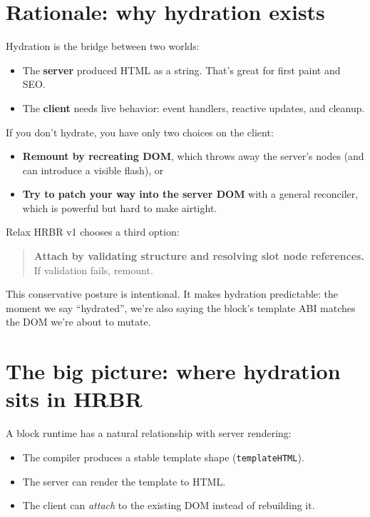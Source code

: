 \section{Rationale: why hydration exists}

Hydration is the bridge between two worlds:

\begin{itemize}
  \item The \textbf{server} produced HTML as a string. That’s great for first paint and SEO.
  \item The \textbf{client} needs live behavior: event handlers, reactive updates, and cleanup.
\end{itemize}

If you don’t hydrate, you have only two choices on the client:

\begin{itemize}
  \item \textbf{Remount by recreating DOM}, which throws away the server’s nodes (and can introduce a visible flash), or
  \item \textbf{Try to patch your way into the server DOM} with a general reconciler, which is powerful but hard to make airtight.
\end{itemize}

Relax HRBR v1 chooses a third option:

\begin{quote}
	\textbf{Attach by validating structure and resolving slot node references.} If validation fails, remount.
\end{quote}

This conservative posture is intentional. It makes hydration predictable: the moment we say “hydrated”, we’re also saying the block’s template ABI matches the DOM we’re about to mutate.

\section{The big picture: where hydration sits in HRBR}

A block runtime has a natural relationship with server rendering:

\begin{itemize}
  \item The compiler produces a stable template shape (\texttt{templateHTML}).
  \item The server can render the template to HTML.
  \item The client can \emph{attach} to the existing DOM instead of rebuilding it.
\end{itemize}

